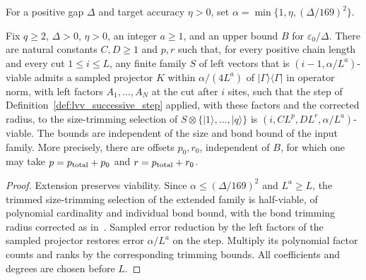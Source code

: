 \begin{definition}
    \label{def:lvv_successive_precision}
    \leanok
    For a positive gap $\Delta$ and target accuracy $\eta>0$, set
    $\alpha=\min\{1,\eta,(\Delta/169)^2\}$.
\end{definition}

\begin{lemma}
    \label{thm:lvv_sampled_successor}
    \leanok
    Fix $q\ge2$, $\Delta>0$, $\eta>0$, an integer $a\ge1$, and an upper bound $B$ for
    $\varepsilon_0/\Delta$. There are natural constants $C,D\ge1$ and
    $p,r$ such that, for every positive chain length and every cut
    $1\le i\le L$, any finite family $S$ of left vectors
    that is $(i-1,\alpha/L^a)$-viable admits a sampled projector $K$
    within $\alpha/(4L^a)$ of $|\Gamma\rangle\langle\Gamma|$ in operator
    norm, with left factors $A_1,\ldots,A_N$ at the cut after $i$ sites,
    such that the step of Definition~\ref{def:lvv_successive_step}
    applied, with these factors and the corrected radius, to the
    size-trimming selection of $S\otimes\{|1\rangle,\ldots,|q\rangle\}$ is
    $(i,CL^p,DL^r,\alpha/L^a)$-viable.
    The bounds are independent of the size and bond bound of the input family.
    More precisely, there are offsets $p_0,r_0$, independent of $B$, for
    which one may take $p=p_{\rm total}+p_0$ and
    $r=p_{\rm total}+r_0$.
\end{lemma}
\begin{proof}
    \leanok
    Extension preserves viability. Since $\alpha\le(\Delta/169)^2$ and $L^a\ge L$,
    the trimmed size-trimming selection of the extended family is
    half-viable, of polynomial cardinality and individual bond
    bound, with the bond trimming radius corrected as
    in~\cite{gap:lvv13_trimming_radius}. Sampled error reduction by the
    left factors of the sampled projector restores error $\alpha/L^a$ on
    the step. Multiply its polynomial factor counts and ranks by the
    corresponding trimming bounds. All coefficients and degrees are chosen
    before $L$.
\end{proof}

